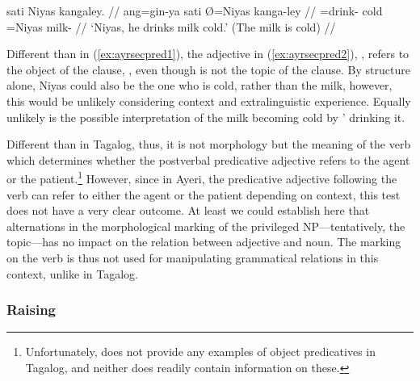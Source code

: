 \ex\label{ex:ayrsecpred2}
\begingl[aboveglcskip=1.5em, aboveglftskip=1.75em]
	 sati Niyas kangaley. //
	\glb ang=gin-ya sati Ø=Niyas kanga-ley //
	\glc \AgtT{}=drink-\TsgM{}
		cold
		\Top{}=Niyas%
		milk-\PargI{}%
			 //
	\glft `Niyas, he drinks milk cold.' (The milk is cold) //
\endgl
{}
\xe

Different than in (\ref{ex:ayrsecpred1}), the adjective in
(\ref{ex:ayrsecpred2}), , refers to the object of the
clause, , even though  is not
the topic of the clause. By structure alone, Niyas could also be the one who is
cold, rather than the milk, however, this would be unlikely considering context
and extralinguistic experience. Equally unlikely is the possible interpretation
of the milk becoming cold by ' drinking it.

Different than in Tagalog, thus, it is not morphology but the meaning of the
verb which determines whether the postverbal predicative adjective refers to
the agent or the patient.\footnote{Unfortunately, \citet{kroeger1991} does not
provide any examples of object predicatives in Tagalog, and neither does
\citet{schachterotanes1972} readily contain information on these.} However,
since in Ayeri, the predicative adjective following the verb can refer to
either the agent or the patient depending on context, this test does not have a
very clear outcome. At least we could establish here that alternations in the
morphological marking of the privileged NP---tentatively, the topic---has no
impact on the relation between adjective and noun. The marking on the verb is
thus not used for manipulating grammatical relations in this context, unlike in
Tagalog.

\subsubsection{Raising}
\label{subsubsec:raising}

